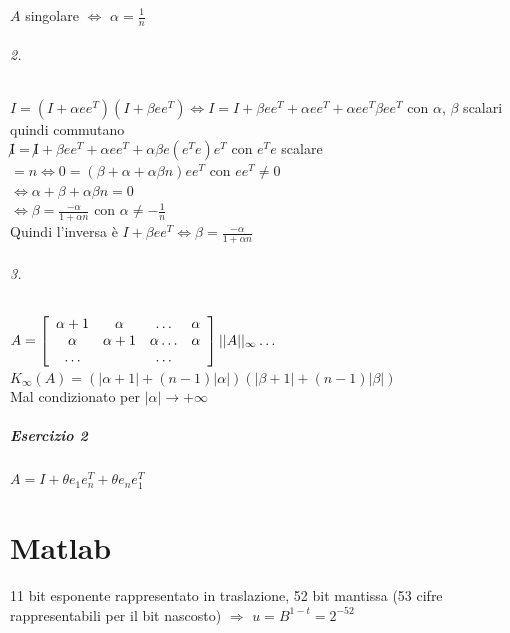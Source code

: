 \documentclass[10pt]{book}
\begin{document}
$A$ singolare $\Leftrightarrow$ $\alpha = \frac{1}{n}$
\subparagraph{2.} $I = (I + \alpha e e^T)(I + \beta e e^T) \Leftrightarrow I = I + \beta e e^T + \alpha e e^T + \alpha e e^T \beta e e^T$ con $\alpha$, $\beta$ scalari quindi commutano\\
$\not I = \not I + \beta e e^T + \alpha e e^T + \alpha \beta e(e^Te)e^T $ con $e^Te$ scalare $= n \Leftrightarrow 0 = (\beta + \alpha + \alpha \beta n)e e^T$ con $e e^T \neq 0$\\
$\Leftrightarrow \alpha + \beta + \alpha \beta n = 0$\\
$\Leftrightarrow \beta = \frac{-\alpha}{1 + \alpha n}$ con $\alpha \neq -\frac{1}{n}$\\
Quindi l'inversa è $I + \beta e e^T \Leftrightarrow \beta = \frac{-\alpha}{1 + \alpha n}$
\subparagraph{3.} $A = \left[\begin{array}{c c c c}
	\alpha + 1 & \alpha & \ldots & \alpha\\
	\alpha & \alpha + 1 & \alpha\ldots & \alpha\\
	\ldots & & \ldots &
\end{array}
\right]
||A||_\infty\ldots$\\
$K_\infty(A) = (|\alpha + 1| + (n - 1)|\alpha|)(|\beta + 1| + (n-1)|\beta|)$\\
Mal condizionato per $|\alpha| \rightarrow +\infty$
\paragraph{Esercizio 2} $A = I + \theta e_1 e_n ^T + \theta e_n e_1^T$
\pagebreak
\chapter{Matlab}
11 bit esponente rappresentato in traslazione, 52 bit mantissa (53 cifre rappresentabili per il bit nascosto) $\Rightarrow$ $u = B^{1-t} = 2^{-52}$
\end{document}
